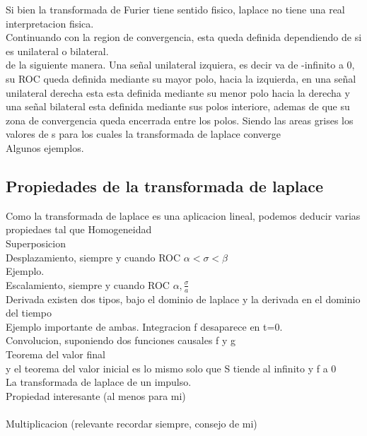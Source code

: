 Si bien la transformada de Furier tiene sentido fisico, laplace no tiene una real interpretacion fisica.\\
Continuando con la region de convergencia, esta queda definida dependiendo de si es unilateral o bilateral. \\
de la siguiente manera. Una señal unilateral izquiera, es decir va de -infinito a 0, su ROC queda definida mediante su mayor polo, hacia la izquierda, en una señal unilateral derecha esta esta definida mediante su menor polo hacia la derecha y una señal bilateral esta definida mediante sus polos interiore, ademas de que su zona de convergencia queda encerrada entre los polos.
Siendo las areas grises los valores de s para los cuales la transformada de laplace converge\\ 
Algunos ejemplos.
\newpage
\subsection{Propiedades de la transformada de laplace}
Como la transformada de laplace es una aplicacion lineal, podemos deducir varias propiedaes tal que
Homogeneidad
\\
Superposicion
\\
Desplazamiento, siempre y cuando ROC $ \alpha < \sigma < \beta$
\\
Ejemplo.
\\
Escalamiento, siempre y cuando ROC  $\alpha , \frac{\sigma}{a}$
\\
Derivada existen dos tipos, bajo el dominio de laplace
y la derivada en el dominio del tiempo
\\
Ejemplo importante de ambas.
Integracion f desaparece en t=0.
\\
Convolucion, suponiendo dos funciones causales f y g
\\
Teorema del valor final
\\
y el teorema del valor inicial es lo mismo solo que S tiende al infinito y f a 0\\
La transformada de laplace de un impulso.
\\
Propiedad interesante (al menos para mi)
\\
\\
Multiplicacion (relevante recordar siempre, consejo de mi)
\newpage
